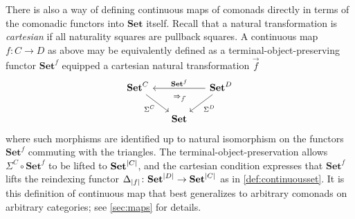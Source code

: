 \documentclass[11pt, oneside, article]{memoir}
\theoremstyle{plain}
\newtheorem{proposition}[theorem]{Proposition}
\theoremstyle{definition}
\theoremstyle{remark}
\newenvironment{remark}
{\renewcommand\qedsymbol{$\lrcorner$}%
  \pushQED{\qed}\myremark}
{\popQED\endmyremark}
\DeclarePairedDelimiter{\abs}{\lvert}{\rvert}
\newcommand{\namedcat}[1]{\mathbf{#1}}
\newcommand{\Set}{\namedcat{Set}}
\newcommand{\Con}{\namedcat{Cmd}^\natural}
\newcommand{\ConSet}{\Con}
\newcommand{\ConO}{\Con}
\newcommand{\ConOSet}{\ConO}
\newcommand{\CoalgOn}[2]{{#2}^{#1}}
\newcommand{\CoalgSet}[1]{\CoalgOn{#1}{\Set}}
\newcommand{\CoalgSetp}[1]{\CoalgOn{#1}{\Set}}
\newcommand{\clift}[1]{\overline{#1}}
\newcommand{\pts}[1]{{\abs{#1}}}
\newcommand{\one}[1]{\pts{#1}}
\newcommand{\carr}{\Sigma}
\newcommand{\reindex}[1]{\Delta_{#1}}
\newcommand{\car}[1]{\carr^{#1}}
\newcommand{\carC}{\car{\cC}}
\newcommand{\carD}{\car{\cD}}
\newcommand{\con}[2]{{#1}^{#2}}
\newcommand{\connat}[1]{\vec{#1}}
\newcommand{\cmnd}[1]{{#1}}
\newcommand{\cC}{\cmnd{C}}
\newcommand{\cD}{\cmnd{D}}
\newcommand{\CSet}{\CoalgSet{\cC}}
\newcommand{\CSetp}{\CoalgSetp{\cC}}
\newcommand{\DSet}{\CoalgSet{\cD}}
\newcommand{\DSetp}{\CoalgSet{\cD}}
\newcommand{\SetpC}{\Set^\pts{\cC}}
\newcommand{\SetpD}{\Set^\pts{\cD}}
\begin{document}
\begin{remark}\label{rem:laxtriangle}
  There is also a way of defining continuous maps of comonads directly
  in terms of the comonadic functors into $\Set$ itself. Recall that a
  natural transformation is \emph{cartesian} if all naturality squares
  are pullback squares. A continuous map $f \colon \cC \to \cD$ as
  above may be equivalently defined as a terminal-object-preserving
  functor $\con{\Set}{f}$ equipped a cartesian natural transformation
  $\connat{f}$
  \[
    \begin{tikzcd}[column sep=15pt]
      \CSet && \DSet \\
      & \Set
      \arrow["{\con{\Set}{f}}"', from=1-3, to=1-1]
      \arrow["\carC"', ""{name=0, anchor=center, inner sep=0}, from=1-1, to=2-2]
      \arrow["\carD", ""{name=1, anchor=center, inner sep=0}, from=1-3, to=2-2]
      \arrow["\Rightarrow_{\connat{f}}", shift right=10pt, draw=none, from=1, to=0]
    \end{tikzcd}
  \]
  where such morphisms are identified up to natural isomorphism on
  the functors $\con{\Set}{f}$ commuting with the triangles. The
  terminal-object-preservation allows $\carC \circ \con{\Set}{f}$ to
  be lifted to $\SetpC$, and the cartesian condition expresses that
  $\con{\Set}{f}$ lifts the reindexing functor
  $\reindex{\one{f}} \colon \SetpD \to \SetpC$ as in
  \cref{def:continuousset}. It is this definition of continuous map
  that best generalizes to arbitrary comonads on arbitrary categories;
  see \cref{sec:maps} for details.
\end{remark}


\end{document}
